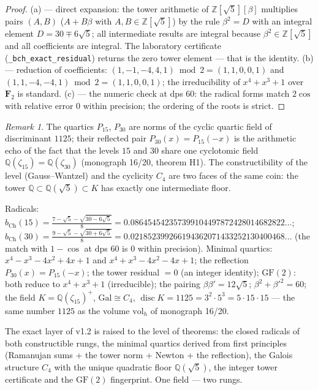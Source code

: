 \documentclass[11pt,a4paper]{article}
\theoremstyle{plain}
\theoremstyle{definition}
\theoremstyle{remark}
\newtheorem{remark}[theorem]{Remark}
\newcommand{\ZZ}{\mathbb{Z}}
\newcommand{\QQ}{\mathbb{Q}}
\newcommand{\disc}{\operatorname{disc}}
\begin{document}
\begin{proof}
(a) --- direct expansion: the tower arithmetic of
$\ZZ[\sqrt5][\beta]$ multiplies pairs $(A,B)$
($A+B\beta$ with $A,B\in\ZZ[\sqrt5]$) by the rule $\beta^2=D$
with an integral element $D=30\mp6\sqrt5$; all intermediate
results are integral because $\beta^2\in\ZZ[\sqrt5]$ and all
coefficients are integral. The laboratory certificate
(\texttt{\_bch\_exact\_residual}) returns the zero tower element
--- that is the identity. (b) --- reduction of coefficients:
$(1,-1,-4,4,1)\bmod2=(1,1,0,0,1)$ and
$(1,1,-4,-4,1)\bmod2=(1,1,0,0,1)$; the irreducibility of
$x^4+x^3+1$ over $\mathbf{F}_2$ is standard. (c) --- the numeric
check at dps 60: the radical forms match $2\cos$ with relative
error $0$ within precision; the ordering of the roots is strict.
\end{proof}

\begin{remark}
The quartics $P_{15}$, $P_{30}$ are norms of the cyclic quartic
field of discriminant $1125$; their reflected pair
$P_{30}(x)=P_{15}(-x)$ is the arithmetic echo of the fact that
the levels $15$ and $30$ share one cyclotomic field
$\QQ(\zeta_{15})=\QQ(\zeta_{30})$ (monograph 16/20, theorem H1).
The constructibility of the level (Gauss--Wantzel) and the
cyclicity $C_4$ are two faces of the same coin: the tower
$\QQ\subset\QQ(\sqrt5)\subset K$ has exactly one intermediate
floor.
\end{remark}

\begin{databox}
Radicals: $b_{\mathrm{Ch}}(15)=\frac{7-\sqrt5-\sqrt{30-6\sqrt5}}{8}
=0.086454542357399104497872428014682822\ldots$;
$b_{\mathrm{Ch}}(30)=\frac{9-\sqrt5-\sqrt{30+6\sqrt5}}{8}
=0.021852399266194362071433252130400468\ldots$
(the match with $1-\cos$ at dps 60 is $0$ within precision).
Minimal quartics: $x^4-x^3-4x^2+4x+1$ and
$x^4+x^3-4x^2-4x+1$; the reflection $P_{30}(x)=P_{15}(-x)$;
the tower residual $=0$ (an integer identity); $\mathrm{GF}(2)$:
both reduce to $x^4+x^3+1$ (irreducible); the pairing
$\beta\beta'=12\sqrt5$; $\beta^2+\beta'^2=60$; the field
$K=\QQ(\zeta_{15})^+$, $\mathrm{Gal}\cong C_4$,
$\disc K=1125=3^2\cdot5^3=5\cdot15\cdot15$ --- the same number
$1125$ as the volume $\mathrm{vol}_h$ of monograph 16/20.
\end{databox}

\begin{statusbox}[summary]
The exact layer of v1.2 is raised to the level of theorems: the
closed radicals of both constructible rungs, the minimal quartics
derived from first principles (Ramanujan sums + the tower norm +
Newton + the reflection), the Galois structure $C_4$ with the
unique quadratic floor $\QQ(\sqrt5)$, the integer tower
certificate and the $\mathrm{GF}(2)$ fingerprint. One field ---
two rungs.
\end{statusbox}
\end{document}
